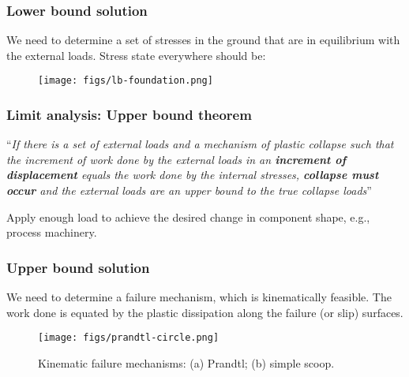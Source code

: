 \documentclass[handout]{beamer}
\begin{document}
\begin{frame}
	\frametitle{Lower bound solution}
	We need to determine a set of
stresses in the ground that are in equilibrium with the external
loads. Stress state everywhere should be:

		\centering
		\begin{figure}
			\texttt{[image: figs/lb-foundation.png]}
		\end{figure}

\end{frame}

\begin{frame}
	\frametitle{Limit analysis: Upper bound theorem}
	``\textit{If there is a set of external loads and a mechanism of plastic collapse such
that the increment of work done by the external loads in an \textbf{increment of
	displacement} equals the work done by the internal stresses, \textbf{collapse
must occur} and the external loads are an upper bound to the true
collapse loads}''\\
	\vspace{1em}

	Apply enough load to achieve the desired change in component shape, e.g., process machinery.
\end{frame}

\begin{frame}
	\frametitle{Upper bound solution}
	We need to determine a failure
mechanism, which is kinematically feasible. The work done is
equated by the plastic dissipation along the failure (or slip)
	surfaces.

		\begin{figure}
			\texttt{[image: figs/prandtl-circle.png]}
			\caption{Kinematic failure mechanisms: (a) Prandtl; (b) simple scoop.}
		\end{figure}

\end{frame}
\end{document}
